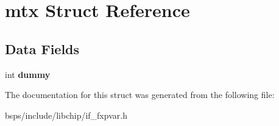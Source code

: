 \hypertarget{structmtx}{}\section{mtx Struct Reference}
\label{structmtx}
\subsection*{Data Fields}
\begin{DoxyCompactItemize}
\item 
\mbox{\label{structmtx_a3d706ff29f1ecd28965f11c28ff13027}} 
int {\bfseries dummy}
\end{DoxyCompactItemize}


The documentation for this struct was generated from the following file\+:\begin{DoxyCompactItemize}
\item 
bsps/include/libchip/if\+\_\+fxpvar.\+h\end{DoxyCompactItemize}
